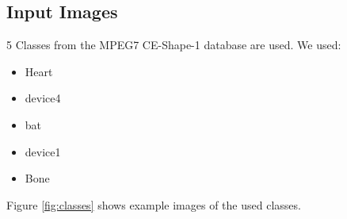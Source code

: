 \documentclass[a4paper,psfig,subfigure,epsfig,fleqn,amssmb,float,caption,fontenc,ausarbeitung]{article}
\begin{document}
\subsection{Input Images}
\label{sec:input}

5 Classes from the MPEG7 CE-Shape-1 database \cite{latecki2000shape} are used. We used:

\begin{itemize}
	\item Heart
	\item device4
	\item bat
	\item device1
	\item Bone
\end{itemize}

Figure \ref{fig:classes} shows example images of the used classes.
\end{document}
